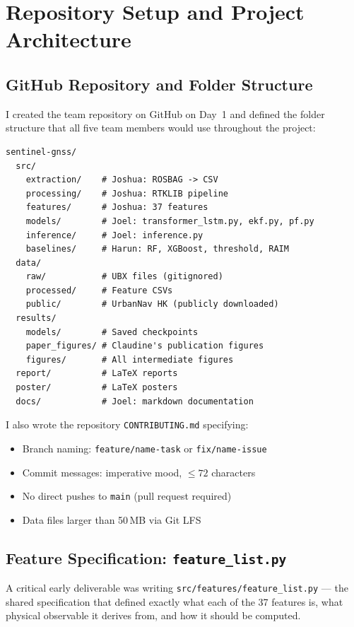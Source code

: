 \documentclass[12pt,a4paper]{article}
\newcommand{\code}[1]{\texttt{#1}}
\begin{document}
\section{Repository Setup and Project Architecture}

\subsection{GitHub Repository and Folder Structure}

I created the team repository on GitHub on Day~1 and defined the folder structure
that all five team members would use throughout the project:

\begin{verbatim}
sentinel-gnss/
  src/
    extraction/    # Joshua: ROSBAG -> CSV
    processing/    # Joshua: RTKLIB pipeline
    features/      # Joshua: 37 features
    models/        # Joel: transformer_lstm.py, ekf.py, pf.py
    inference/     # Joel: inference.py
    baselines/     # Harun: RF, XGBoost, threshold, RAIM
  data/
    raw/           # UBX files (gitignored)
    processed/     # Feature CSVs
    public/        # UrbanNav HK (publicly downloaded)
  results/
    models/        # Saved checkpoints
    paper_figures/ # Claudine's publication figures
    figures/       # All intermediate figures
  report/          # LaTeX reports
  poster/          # LaTeX posters
  docs/            # Joel: markdown documentation
\end{verbatim}

I also wrote the repository \code{CONTRIBUTING.md} specifying:
\begin{itemize}
  \item Branch naming: \code{feature/name-task} or \code{fix/name-issue}
  \item Commit messages: imperative mood, $\leq 72$ characters
  \item No direct pushes to \code{main} (pull request required)
  \item Data files larger than 50\,MB via Git LFS
\end{itemize}

\subsection{Feature Specification: \texttt{feature\_list.py}}

A critical early deliverable was writing \code{src/features/feature\_list.py} ---
the shared specification that defined exactly what each of the 37 features is,
what physical observable it derives from, and how it should be computed.
\end{document}
